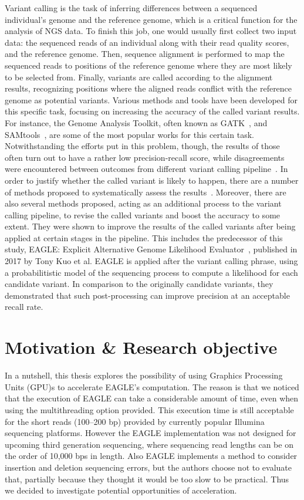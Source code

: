 \documentclass{PHlab-thesis}
\begin{document}
Variant calling is the task of inferring differences between a sequenced individual's genome and the reference genome, which is a critical function for the analysis of NGS data. To finish this job, one would usually first collect two input data: the sequenced reads of an individual along with their read quality scores, and the reference genome. Then, sequence alignment is performed to map the sequenced reads to positions of the reference genome where they are most likely to be selected from. Finally, variants are called according to the alignment results, recognizing positions where the aligned reads conflict with the reference genome as potential variants.
Various methods and tools have been developed for this specific task, focusing on increasing the accuracy of the called variant results. For instance, the Genome Analysis Toolkit, often known as GATK~\cite{mckenna2010genome}, and SAMtools~\cite{li2009sequence}, are some of the most popular works for this certain task. Notwithstanding the efforts put in this problem, though, the results of those often turn out to have a rather low precision-recall score, while disagreements were encountered between outcomes from different variant calling pipeline~\cite{o2013low}. In order to justify whether the called variant is likely to happen, there are a number of methods proposed to systematically assess the results~\cite{hwang2015systematic,yu2013comparing}. Moreover, there are also several methods proposed, acting as an additional process to the variant calling pipeline, to revise the called variants and boost the accuracy to some extent. They were shown to improve the results of the called variants after being applied at certain stages in the pipeline. This includes the predecessor of this study, EAGLE: Explicit Alternative Genome Likelihood Evaluator~\cite{kuo2018eagle}, published in 2017 by Tony Kuo et al.  EAGLE is applied after the variant calling phrase, using a probabilitistic model of the sequencing process to compute a likelihood for each candidate variant.  In comparison to the originally candidate variants, they demonstrated that such post-processing can improve precision at an acceptable recall rate.

\section{Motivation \& Research objective}
In a nutshell, this thesis explores the possibility of using Graphics Processing Units (GPU)s to accelerate EAGLE's computation.
The reason is that we noticed that the execution of EAGLE can take a considerable amount of time, even when using the multithreading option provided.  This execution time is still acceptable for the short reads (100--200 bp) provided by currently popular Illumina sequencing platforms.  However the EAGLE implementation was not
designed for upcoming third generation sequencing, where sequencing read lengths can be on the order of 10,000 bps in length.  Also EAGLE implements a method to consider insertion and deletion sequencing errors, but the authors
choose not to evaluate that, partially because they thought it would be too slow to be practical.
Thus we decided to investigate potential opportunities of acceleration.
\end{document}
